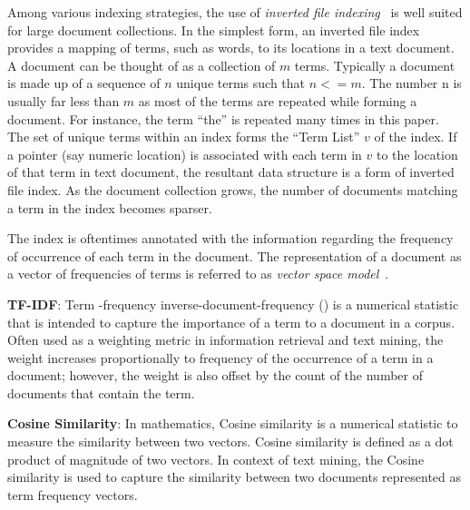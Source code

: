 Among various indexing strategies,
the use of \textit{inverted file indexing}~\cite{frakes1992introduction}
is well suited for large document collections.
In the simplest form, an inverted file index provides
a mapping of terms, such as words, to its locations in a text document.
A document can be thought of as a collection of $m$ terms.
Typically a document is made up of a sequence of $n$ unique terms
such that $n <= m$.
The number n is usually far less than
$m$ as most of the terms are repeated while forming a document. 
For instance, the term ``the'' is repeated many times in this paper.
The set of unique terms within an index forms
the ``Term List'' $v$ of the index.
If a pointer (say numeric location) is associated with each term in $v$ to the location
of that term in text document, the resultant data structure
is a form of inverted file index.
As the document collection grows,
the number of documents matching a term in the index becomes sparser.

The index is oftentimes annotated with the information regarding 
the frequency of occurrence of each term in the document. 
The representation of a document as a vector of frequencies
of terms is referred to as \textit{vector space model}~\cite{singhal2001modern,frakes1992introduction}.

\textbf{TF-IDF}\cite{manning2008introduction}:
Term -frequency inverse-document-frequency () is a numerical statistic that is intended to capture the importance of a term to a document in a corpus.
Often used as a weighting metric in information retrieval and text mining,
the  weight increases proportionally to frequency of the occurrence of a term in a document; however, the weight is also offset by the count of the number of documents that contain the term.

\textbf{Cosine Similarity}\cite{singhal2001modern}: In mathematics, Cosine similarity is a numerical statistic to measure the similarity between two vectors.
Cosine similarity is defined as a dot product of magnitude of two vectors.
In context of text mining, the Cosine similarity is used to capture the similarity between two documents represented as term frequency vectors.

